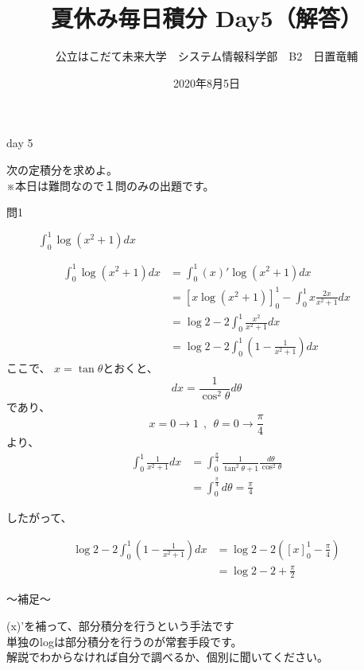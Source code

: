 \documentclass[dvipdfmx,uplatex]{jsarticle}
\title{夏休み毎日積分 Day5（解答）}
\author{公立はこだて未来大学　システム情報科学部　B2　日置竜輔}
\date{2020年8月5日}
\begin{document}
\maketitle

\begin{itembox}[c]{day 5}
    \begin{center}
        次の定積分を求めよ。\\
        ※本日は難問なので１問のみの出題です。
    \end{center}
\end{itembox}

\begin{description}
    \item [問1] $ \displaystyle \int_0^1 \log(x^2 + 1) dx $
\end{description}

\begin{align*}
    \int_0^1 \log(x^2 + 1) dx &= \int_0^1 (x)'\log(x^2 + 1) dx \\
        &= [x\log(x^2 + 1)]_0^1 - \int_0^1 x\frac{2x}{x^2 + 1} dx \\
        &= \log2 - 2\int_0^1\frac{x^2}{x^2 + 1} dx \\
        &= \log2 - 2\int_0^1 (1 - \frac{1}{x^2+1} ) dx
\end{align*}
ここで、 $ \displaystyle x = \tan{\theta} $とおくと、
\begin{equation*}
  dx = \frac{1}{\cos^2\theta}d{\theta}
\end{equation*}
であり、
\begin{equation*}
  x = 0 → 1 ~~,~~\theta = 0 → \frac{\pi}{4}
\end{equation*}
より、
\begin{align*}
    \int_0^1 \frac{1}{x^2 + 1} dx &= \int_0^\frac{\pi}{4} \frac{1}{\tan^2\theta + 1}\frac{d\theta}{\cos^2\theta} \\
    &= \int_0^\frac{\pi}{4} d\theta = \frac{\pi}{4}
\end{align*}

したがって、

\begin{align*}
    \log2 - 2\int_0^1 (1 - \frac{1}{x^2 + 1}) dx &= \log2 - 2([x]_0^1 - \frac{\pi}{4}) \\
    &= \log2 - 2 + \frac{\pi}{2}
\end{align*}

\begin{boxnote}
    〜補足〜
    \begin{center}
        (x)'を補って、部分積分を行うという手法です\\
        単独のlogは部分積分を行うのが常套手段です。 \\
        解説でわからなければ自分で調べるか、個別に聞いてください。
    \end{center}
\end{boxnote}
\end{document}
